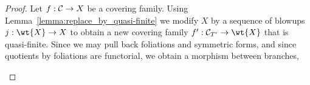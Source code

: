 \documentclass[main.tex]{subfiles}
\begin{document}
\begin{proof}
Let $f : \mathcal{C} \to X$ be a covering family. Using Lemma~\ref{lemma:replace_by_quasi-finite} we modify $X$ by a sequence of blowups $j : \wt{X} \to X$ to obtain a new covering family $f' : \cC_{T'} \to \wt{X}$ that is quasi-finite. Since we may pull back foliations and symmetric forms, and since quotients by foliations are functorial, we obtain a morphism between branches,


\begin{center}
\end{center}


\end{proof}
\end{document}

